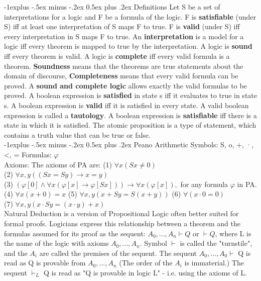 \documentclass[letterpaper, 8pt]{extarticle}
\makeatletter
\renewcommand{\subsection}{\@startsection{subsection}{2}{0mm}%
                                {-1explus -.5ex minus -.2ex}%
                                {0.5ex plus .2ex}%
                                {\normalfont\small\bfseries}}
\makeatother
\begin{document}
\begin{multicols*}{3}
    \subsection{Definitions}
    Let S be a set of interpretations for a logic and F be a formula of the logic.
    F is \textbf{satisfiable} (under S) iff at least one interpretation of S maps F to true.
    F is \textbf{valid} (under S) iff every interpretation in S maps F to true.
    An \textbf{interpretation} is a model for a logic iff
    every theorem is mapped to true by the interpretation.
    A logic is \textbf{sound} iff every theorem is valid.
    A logic is \textbf{complete} iff every valid formula is a theorem.
    \textbf{Soundness} means that the theorems are true statements
    about the domain of discourse,
    \textbf{Completeness} means that every valid formula can be proved.
    A \textbf{sound and complete logic} allows exactly the valid formulas to be proved.
    A boolean expression is \textbf{satisfied} in state s
    iff it evaluates to true in state s.
    A boolean expression is \textbf{valid} iff it is satisfied in every state.
    A valid boolean expression is called a \textbf{tautology}.
    A boolean expression is \textbf{satisfiable}
    iff there is a state in which it is satisfied.
    The atomic proposition is a type of statement,
    which contains a truth value that can be true or false.\\

    \subsection{Peano Arithmetic}
    Symbols: S, o, +, ·, <, = Formulas: $\varphi$ \\
    Axioms: The axioms of PA are:
    (1) $\forall x (Sx \not = 0)$\\
    (2) $\forall x,y ((Sx = Sy) \xrightarrow{} x =y)$\\
    (3) $( \varphi[0] \land \forall x(\varphi[x] \xrightarrow{} \varphi[Sx])) \xrightarrow{} \forall x (\varphi[x]),$ for any formula $\varphi$ in PA.\\
    (4) $\forall x (x + 0) =x$ (5) $\forall x,y(x + Sy = S(x+y))$ (6) $\forall (x \cdot 0 = 0)$\\
    (7) $\forall x,y(x \cdot Sy = (x \cdot y) + x)$ \\
    Natural Deduction is a version of Propositional Logic often
    better suited for formal proofs.
    Logicians express this relationship between a theorem
    and the formulas assumed for its proof as the sequent:
    $A_0,...,A_n \vdash Q$ or $\vdash Q$,
    where L is the name of the logic with axioms $A_0,...,A_n$.
    Symbol $\vdash$ is called the "turnstile",
    and the $A_i$ are called the premises of the sequent.
    The sequent $A_0,...,A_0 \vdash$ Q is read
    as Q is provable from $A_0,...,A_n$
    (The order of the $A_i$ is immaterial.)
    The sequent $\vdash_L$ Q is read as "Q is provable in logic L" -
    i.e. using the axioms of L.\\


\end{multicols*}
\end{document}
